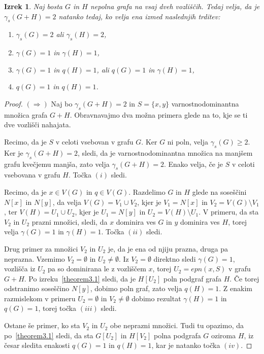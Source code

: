 \documentclass[12pt,a4paper,twoside]{article}
\theoremstyle{definition} %
\theoremstyle{plain} %
\newtheorem{izrek}[definicija]{Izrek}
\numberwithin{equation}{section}  %
\begin{document}
\begin{izrek} \label{gamma=2}
Naj bosta $G$ in $H$ nepolna grafa na vsaj dveh vozliščih. Tedaj velja, da je $\gamma_s(G + H) = 2$ natanko tedaj, ko velja ena izmed naslednjih trditev:
\begin{enumerate}[label=(\roman*)]
\item $\gamma_s(G) = 2$ ali $\gamma_s(H) = 2$,
\item $\gamma(G) = 1$ in $\gamma(H) = 1$,
\item $\gamma(G) = 1$ in $q(H) = 1$, ali $q(G) = 1$ in $\gamma(H) = 1$,
\item $q(G) = 1$ in $q(H) = 1$.
\end{enumerate}
\end{izrek}
\begin{proof}
$(\Rightarrow)$ Naj bo $\gamma_s(G + H) = 2$ in $S = \{x,y\}$ varnostnodominantna množica grafa $G + H$. Obravnavajmo dva možna primera glede na to, kje se ti dve vozlišči nahajata.

Recimo, da je $S$ v celoti vsebovan v grafu $G$. Ker $G$ ni poln, velja $\gamma_s(G) \geq 2$. Ker je $\gamma_s(G + H) = 2$, sledi, da je varnostnodominantna množica na manjšem grafu kvečjemu manjša, zato velja $\gamma_s(G + H) = 2$. Enako velja, če je $S$ v celoti vsebovana v grafu $H$. Točka $(i)$ sledi.

Recimo, da je $x \in V(G)$ in $q \in V(G)$. Razdelimo $G$ in $H$ glede na soseščini $N[x]$ in $N[y]$, da velja $V(G) = V_1 \cup V_2$, kjer je $V_1 = N[x]$ in $V_2= V(G) \setminus V_1$, ter $V(H) = U_1 \cup U_2$, kjer je $U_1 = N[y]$ in $U_2= V(H) \setminus U_1$. V primeru, da sta $V_2$ in $U_2$ prazni množici, sledi, da $x$ dominira ves $G$ in $y$ dominira ves $H$, torej velja $\gamma(G) = 1$ in $\gamma(H) = 1$. Točka $(ii)$ sledi.

Drug primer za množici $V_2$ in $U_2$ je, da je ena od njiju prazna, druga pa neprazna. Vzemimo $V_2 = \emptyset$ in $U_2 \neq \emptyset$. Iz $V_2 = \emptyset$ direktno sledi $\gamma(G) = 1$, vozlišča iz $U_2$ pa so dominirana le z vozliščem $x$, torej $U_2 = epn(x, S)$ v grafu $G + H$. Po izreku~\ref{theorem3.1} sledi, da je $H[U_2]$ poln podgraf grafa $H$. Če torej odstranimo soseščino $N[y]$, dobimo poln graf, zato velja $q(H) = 1$. Z enakim razmislekom v primeru $U_2 = \emptyset$ in $V_2 \neq \emptyset$ dobimo rezultat $\gamma(H) = 1$ in $q(G) = 1$, torej točka $(iii)$ sledi.

Ostane še primer, ko sta $V_2$ in $U_2$ obe neprazni množici. Tudi tu opazimo, da po~\ref{theorem3.1} sledi, da sta $G[U_2]$ in $H[V_2]$ polna podgrafa $G$ oziroma $H$, iz česar sledita enakosti $q(G) = 1$ in $q(H) = 1$, kar je natanko točka $(iv)$.


\end{proof}
\end{document}
